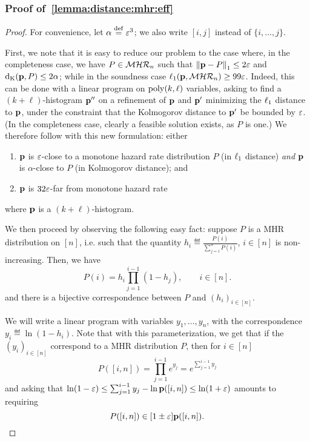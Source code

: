 \subsubsection{Proof of~\cref{lemma:distance:mhr:eff}}\label{app:structural:projection:proofs:mhr}

\lemmaefficientdistancemhr*

\begin{proof}
For convenience, let $\alpha \eqdef \eps^3$; we also write $[i,j]$ instead of $\{i,\dots,j\}$.

First, we note that it is easy to reduce our problem to the case where, in the completeness case, we have $P\in\classmhr$ such that $\normone{\D-P} \leq 2\eps$  and $\kolmogorov{\D}{P} \leq 2\alpha$; while in the soundness case $\lp[1](\D,\classmhr) \geq 99\eps$. Indeed, this can be done with a linear program on $\poly(k,\ell)$ variables, asking to find a $(k+\ell)$-histogram $\D^{\prime\prime}$ on a refinement of $\D$ and $\D^\prime$ minimizing the $\lp[1]$ distance to $\D$, under the constraint that the Kolmogorov distance to $\D^\prime$ be bounded by $\eps$. (In the completeness case, clearly a feasible solution exists, as $P$ is one.) We therefore follow with this new formulation: either
  \begin{enumerate}[\sf(a)]
    \item $\D$ is $\eps$-close to a monotone hazard rate distribution $P$ (in $\lp[1]$ distance) \emph{and} $\D$ is $\alpha$-close to $P$ (in Kolmogorov distance); and
    \item $\D$ is $32\eps$-far from monotone hazard rate
  \end{enumerate} 
where $\D$ is a $(k+\ell)$-histogram.\medskip


We then proceed by observing the following easy fact: suppose $P$ is a MHR distribution on $[n]$, i.e. such that the quantity $h_i \eqdef \frac{P(i)}{\sum_{j=i}^n P(i)}$, $i\in[n]$ is non-increasing. Then, we have
\begin{equation}\label{eq:mhr:parameterization}
  P(i) = h_i \prod_{j=1}^{i-1} (1-h_j), \qquad i\in[n].
\end{equation}
and there is a bijective correspondence between $P$ and $(h_i)_{i\in[n]}$.\medskip

We will write a linear program with variables $y_1,\dots,y_n$, with the correspondence $y_i\eqdef\ln(1-h_i)$. Note that with this parameterization, we get that if the $(y_i)_{i\in[n]}$ correspond to a MHR distribution $P$, then for $i\in[n]$
\[
  P([i,n]) = \prod_{j=1}^{i-1} e^{y_j} = e^{\sum_{j=1}^{i-1} y_j}
\]
and asking that $\ln(1-\eps) \leq \sum_{j=1}^{i-1} y_{j} - \ln \D([i,n]) \leq  \ln(1+\eps)$ amounts to requiring
\[
   P([i,n]) \in [1\pm\eps] \D([i,n]).
\]


\end{proof}
